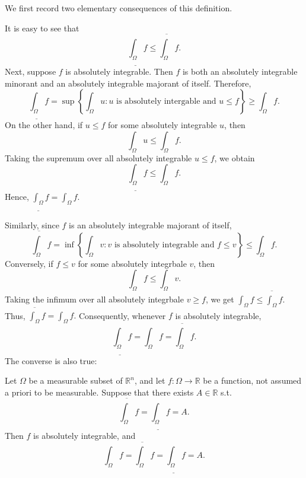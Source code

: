 We first record two elementary consequences of this definition. 

It is easy to see that 
\[
    \underline{\int _\Omega } f \le \overline{\int _\Omega } f.  
\]
Next, suppose \(f\) is absolutely integrable. Then \(f\) is both an absolutely integrable minorant and an absolutely integrable majorant of itself. Therefore,
\[
    \underline{\int _\Omega } f = \sup \left\{ \int _\Omega u: u \text{ is absolutely intergable and } u \le f  \right\} \ge \int _\Omega f.  
\]  
On the other hand, if \(u \le f\) for some absolutely integrable \(u\), then 
\[
    \int _\Omega u \le \int _\Omega f.
\]  
Taking the supremum over all absolutely integrable \(u \le f\), we obtain 
\[
    \underline{\int _\Omega } f \le \int _\Omega f. 
\] 
Hence, \(\underline{\int _\Omega } f = \int _\Omega f \).

Similarly, since \(f\) is an absolutely integrable majorant of itself, 
\[
    \overline{\int _\Omega } f = \inf \left\{ \int _\Omega v: v \text{ is absolutely integrable and } f \le v   \right\} \le \int _\Omega f.  
\]
Conversely, if \(f \le v\) for some absolutely integrbale \(v\), then 
\[
    \int _\Omega f \le \int _\Omega v.
\]  
Taking the infimum over all absolutely integrbale \(v \ge f\), we get \(\int _\Omega f \le \overline{\int _\Omega} f\). Thus, \(\overline{\int _\Omega } f = \int _\Omega f.\) 
Consequently, whenever \(f\) is absolutely integrable,
\[
    \underline{\int _\Omega } f = \int _\Omega f = \overline{\int _\Omega } f.  
\] 
The converse is also true:
\begin{lemma} \label{lm: upper integral and lower integral are same implies absolutely integrable}
    Let \(\Omega \) be a measurable subset of \(\mathbb{R} ^n\), and let \(f: \Omega \to \mathbb{R} \) be a function, not assumed a priori to be measurable. Suppose that there exists \(A \in \mathbb{R}\) s.t. 
    \[
        \overline{\int _\Omega } f = \underline{\int _\Omega} f = A. 
    \]    
    Then \(f\) is absolutely integrable, and 
    \[
       \int _\Omega f = \overline{\int _\Omega } f = \underline{\int _\Omega} f = A. 
    \] 
\end{lemma}

